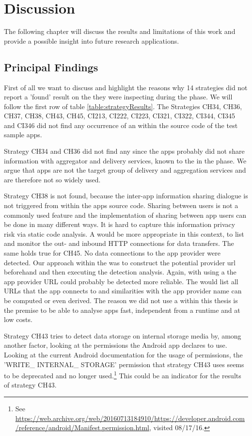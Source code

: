 \section{Discussion}

The following chapter will discuss the results and limitations of this work and provide a possible insight into future research applications.

\subsection{Principal Findings}

First of all we want to discuss and highlight the reasons why 14 strategies did not report a 'found' result on the \ipr they were inspecting during the \sca phase.
We will follow the first row of table \ref{table:strategyResults}.
The Strategies CH34, CH36, CH37, CH38, CH43, CH45, CI213, CI222, CI223, CI321, CI322, CI344, CI345 and CI346 did not find any occurrence of an \ipr within the source code of the test sample apps.

Strategy CH34 and CH36 did not find any \ipr since the apps probably did not share information with aggregator and delivery services, known to the \aiprat in the \ml phase.
We argue that \mH apps are not the target group of delivery and aggregation services and are therefore not so widely used.

Strategy CH38 is not found, because the inter-app information sharing dialogue is not triggered from within the apps source code. 
Sharing between users is not a commonly used feature and the implementation of sharing between app users can be done in many different ways.
It is hard to capture this information privacy risk via static code analysis.
A \dca would be more appropriate in this context, to list and monitor the out- and inbound HTTP connections for data transfers.
The same holds true for CH45.
No data connections to the app provider were detected. 
Our approach within the \aiprat was to construct the potential provider url beforehand and then executing the detection analysis.
Again, with using a \dca the app provider URL could probably be detected more reliable.
The \dca would list all URLs that the app connects to and similarities with the app provider name can be computed or even derived.
The reason we did not use a \dca within this thesis is the premise to be able to analyse \mH apps fast, independent from a runtime and at low costs.

Strategy CH43 tries to detect data storage on internal storage media by, among another factor, looking at the permissions the Android app declares to use.
Looking at the current Android documentation for the usage of permissions, the 'WRITE\_ INTERNAL\_ STORAGE' permission that strategy CH43 uses seems to be deprecated and no longer used.\footnote{\raggedright See \url{https://web.archive.org/web/20160713184910/https://developer.android.com/reference/android/Manifest.permission.html}, visited 08/17/16.}
This could be an indicator for the results of strategy CH43.

